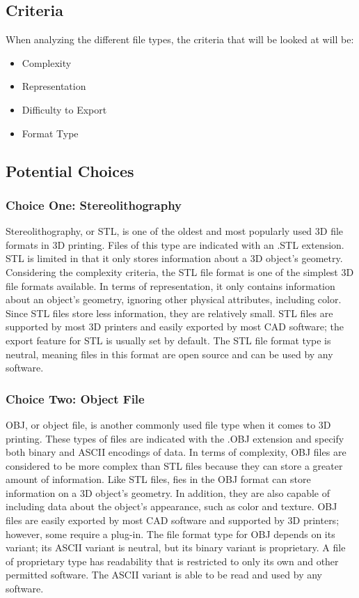 \documentclass[letterpaper, onecolumn, draftclsnofoot, 10pt, compsoc]{IEEEtran}
\begin{document}
\begin{singlespace}
\subsection{Criteria}
When analyzing the different file types, the criteria that will be looked at will be: 
\begin{itemize}
\item Complexity
\item Representation
\item Difficulty to Export
\item Format Type
\end{itemize}
\subsection{Potential Choices}
\subsubsection{Choice One: Stereolithography}
Stereolithography, or STL, is one of the oldest and most popularly used 3D file formats in 3D printing. 
Files of this type are indicated with an .STL extension.
STL is limited in that it only stores information about a 3D object's geometry.
Considering the complexity criteria, the STL file format is one of the simplest 3D file formats available.
In terms of representation, it only contains information about an object's geometry, ignoring other physical attributes, including color.
Since STL files store less information, they are relatively small.
STL files are supported by most 3D printers and easily exported by most CAD software; the export feature for STL is usually set by default. \cite{3dbeginweb}
The STL file format type is neutral, meaning files in this format are open source and can be used by any software.
\cite{all3dpweb}
\subsubsection{Choice Two: Object File}
OBJ, or object file, is another commonly used file type when it comes to 3D printing. 
These types of files are indicated with the .OBJ extension and specify both binary and ASCII encodings of data.
In terms of complexity, OBJ files are considered to be more complex than STL files because they can store a greater amount of information.
Like STL files, fies in the OBJ format can store information on a 3D object's geometry. 
In addition, they are also capable of including data about the object's appearance, such as color and texture. 
OBJ files are easily exported by most CAD software and supported by 3D printers; however, some require a plug-in. \cite{3dbeginweb}
The file format type for OBJ depends on its variant; its ASCII variant is neutral, but its binary variant is proprietary. 
A file of proprietary type has readability that is restricted to only its own and other permitted software. 
The ASCII variant is able to be read and used by any software.
\cite{all3dpweb}


\end{singlespace}
\end{document}
